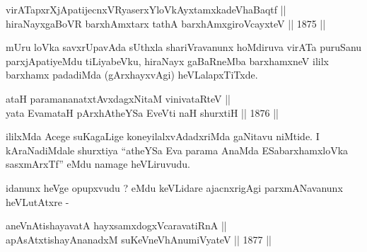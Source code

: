 
\begin{shl}
virATapxrXjApatijecnxVRyaserxYloVkAyxtamxkadeVhaBaqtf || \\
hiraNayxgaBoVR barxhAmx\s tarx tathA barxhAmxgiroVcayxteV \hfill || 1875 ||
  
\end{shl}

\begin{artha}
mUru loVka savxrUpavAda sUthxla shariVravanunx hoMdiruva virATa
puruSanu parxjApatiyeMdu tiLiyabeVku, hiraNayx gaBaRneMba barxhamxneV
ililx barxhamx padadiMda (gArxhayxvAgi) heVLalapxTiTxde.
\end{artha}


\begin{shl}
ataH paramananatxtAvxdagxNitaM vinivataRteV || \\
yata EvamataH pArxhAtheYSa EveVti naH shurxtiH \hfill || 1876 ||
  
\end{shl}

\begin{artha}
ililxMda Acege suKagaLige koneyilalxvAdadxriMda gaNitavu niMtide. I
kAraNadiMdale shurxtiya ``atheYSa Eva parama AnaMda ESabarxhamxloVka
sasxmArxTf'' eMdu namage heVLiruvudu.
\end{artha}

\begin{artha}
idanunx heVge opupxvudu ? eMdu keVLidare ajacnxrigAgi parxmANavanunx heVLutAtxre -
\end{artha}

\begin{shl}
aneVnAtishayavatA hayxsamxdogxVcaravatiRnA || \\
apAsAtxtishayAnanadxM suKeVneVhAnumiVyateV \hfill || 1877 ||
  
\end{shl}

